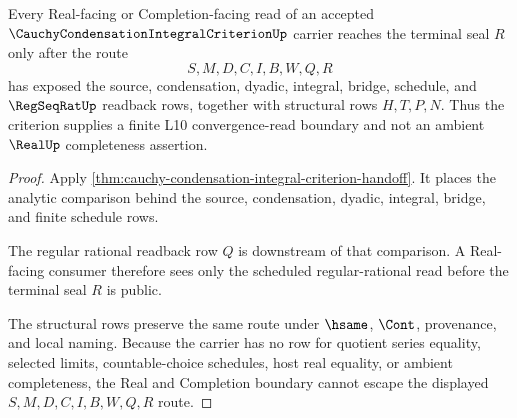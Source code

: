 \begin{theorem}
\label{thm:cauchy-condensation-integral-criterion-regseqrat-real-nonescape}
Every Real-facing or Completion-facing read of an accepted $\CauchyCondensationIntegralCriterionUp$ carrier reaches the terminal seal $R$ only after the route
$$
S,M,D,C,I,B,W,Q,R
$$
has exposed the source, condensation, dyadic, integral, bridge, schedule, and $\RegSeqRatUp$ readback rows, together with structural rows $H,T,P,N$. Thus the criterion supplies a finite L10 convergence-read boundary and not an ambient $\RealUp$ completeness assertion.
\end{theorem}
\begin{proof}
Apply \autoref{thm:cauchy-condensation-integral-criterion-handoff}. It places the analytic comparison behind the source, condensation, dyadic, integral, bridge, and finite schedule rows.

The regular rational readback row $Q$ is downstream of that comparison. A Real-facing consumer therefore sees only the scheduled regular-rational read before the terminal seal $R$ is public.

The structural rows preserve the same route under $\hsame$, $\Cont$, provenance, and local naming. Because the carrier has no row for quotient series equality, selected limits, countable-choice schedules, host real equality, or ambient completeness, the Real and Completion boundary cannot escape the displayed $S,M,D,C,I,B,W,Q,R$ route.
\end{proof}





